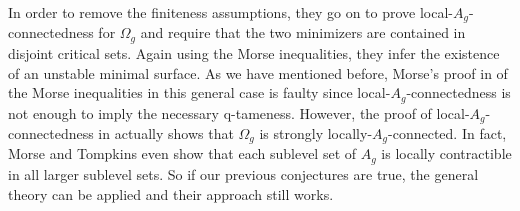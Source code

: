 In order to remove the finiteness assumptions, they go on to prove local-$A_g$-connectedness for $\Omega_g$ and require that the two minimizers are contained in disjoint critical sets. Again using the Morse inequalities, they infer the existence of an unstable minimal surface. As we have mentioned before, Morse's proof in \cite{Morse.1940} of the Morse inequalities in this general case is faulty since local-$A_g$-connectedness is not enough to imply the necessary q-tameness. However, the proof of local-$A_g$-connectedness in \cite{Morse.1939} actually shows that $\Omega_g$ is strongly locally-$A_g$-connected. In fact, Morse and Tompkins even show that each sublevel set of $A_g$ is locally contractible in all larger sublevel sets. So if our previous conjectures are true, the general theory can be applied and their approach still works.